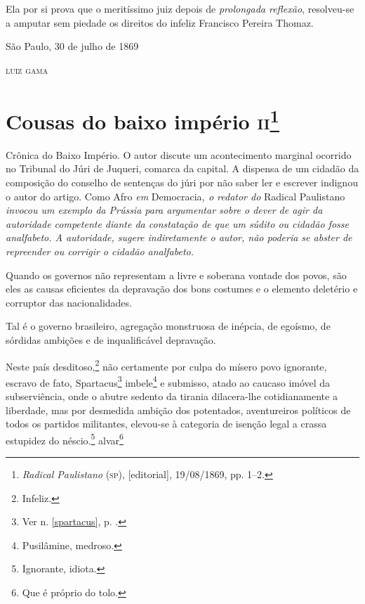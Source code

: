 Ela por si prova que o meritíssimo juiz depois de \emph{prolongada
reflexão}, resolveu-se a amputar sem piedade os direitos do infeliz
Francisco Pereira Thomaz.

\begin{flushright}
São Paulo, 30 de julho de 1869

\textsc{luiz gama}
\end{flushright}

\chapter{Cousas do baixo império \textsc{ii}\footnote{\emph{Radical
  Paulistano} (\textsc{sp}), {[}editorial{]}, 19/08/1869, pp. 1--2.}}

\begin{didascalia}
Crônica do Baixo Império. O autor discute um acontecimento marginal
ocorrido no Tribunal do Júri de Juqueri, comarca da capital. A dispensa
de um cidadão da composição do conselho de sentenças do júri por não
saber ler e escrever indignou o autor do artigo. Como Afro \emph{em}
Democracia\emph{, o redator do} Radical Paulistano \emph{invocou um
exemplo da Prússia para argumentar sobre o dever de agir da autoridade
competente diante da constatação de que um súdito ou cidadão fosse
analfabeto. A autoridade, sugere indiretamente o autor, não poderia se
abster de repreender ou corrigir o cidadão analfabeto.}
\end{didascalia}



Quando os governos não representam a livre e soberana vontade dos povos,
são eles as causas eficientes da depravação dos bons costumes e o
elemento deletério e corruptor das nacionalidades.

Tal é o governo brasileiro, agregação monstruosa de inépcia, de egoísmo,
de sórdidas ambições e de inqualificável depravação.

Neste país desditoso,\footnote{Infeliz.} não certamente por culpa do
mísero povo ignorante, escravo de fato, Spartacus\footnote{Ver n. \ref{spartacus}, 
p. \pageref{spartacus}.} imbele\footnote{Pusilâmine, medroso.} e
submisso, atado ao caucaso imóvel da subserviência, onde o abutre
sedento da tirania dilacera-lhe cotidianamente a liberdade, mas por
desmedida ambição dos potentados, aventureiros políticos de todos os
partidos militantes, elevou-se à categoria de isenção legal a crassa
estupidez do néscio.\footnote{Ignorante, idiota.} alvar\footnote{Que
  é próprio do tolo.}

